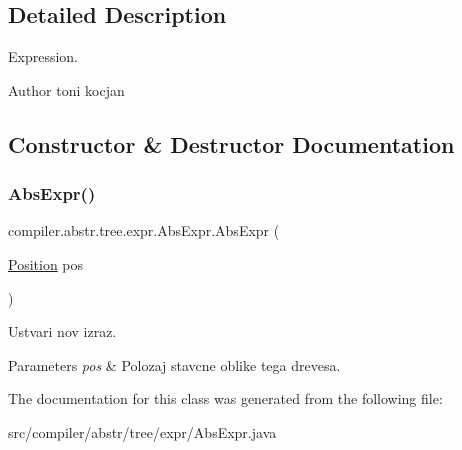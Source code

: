 \subsection{Detailed Description}
Expression.

\begin{DoxyAuthor}{Author}
toni kocjan 
\end{DoxyAuthor}


\subsection{Constructor \& Destructor Documentation}
\mbox{\label{classcompiler_1_1abstr_1_1tree_1_1expr_1_1_abs_expr_a0d19ab25d8eda6d3e3f920f65c38b91f}} 
\subsubsection{\texorpdfstring{Abs\+Expr()}{AbsExpr()}}
{\footnotesize\ttfamily compiler.\+abstr.\+tree.\+expr.\+Abs\+Expr.\+Abs\+Expr (\begin{DoxyParamCaption}\item[{\hyperlink{classcompiler_1_1_position}{Position}}]{pos }\end{DoxyParamCaption})}

Ustvari nov izraz.


\begin{DoxyParams}{Parameters}
{\em pos} & Polozaj stavcne oblike tega drevesa. \\
\hline
\end{DoxyParams}


The documentation for this class was generated from the following file\+:\begin{DoxyCompactItemize}
\item 
src/compiler/abstr/tree/expr/Abs\+Expr.\+java\end{DoxyCompactItemize}
